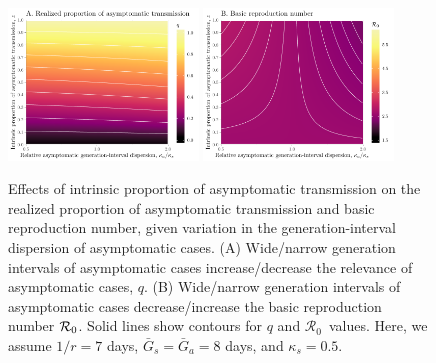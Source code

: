 \documentclass[12pt]{article}
\newcommand{\Ro}{\ensuremath{{\mathcal R}_{0}}\xspace}
\begin{document}
\begin{figure}[!ht]
\begin{center}
\includegraphics[width=0.45\textwidth]{../figheatmap_kappa.pdf}
\mbox{\hspace{0.05\textwidth}}
\includegraphics[width=0.45\textwidth]{../figheatmap_kappa_R0.pdf}
\caption{Effects of intrinsic proportion of asymptomatic transmission on the realized proportion of asymptomatic transmission and basic reproduction number, given variation in
the generation-interval dispersion of asymptomatic cases.
(A) Wide/narrow generation intervals of asymptomatic cases increase/decrease the relevance of asymptomatic cases, $q$.
(B) Wide/narrow generation intervals of asymptomatic cases decrease/increase the basic reproduction number ${\cal{R}}_0$.
Solid lines show contours for $q$ and \Ro\ values.
Here, we assume $1/r=7$ days, $\bar G_s=\bar G_a=8$ days, and $\kappa_s=0.5$.
}
\end{center}
\end{figure}

\pagebreak


\end{document}
